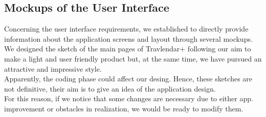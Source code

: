 \subsection{Mockups of the User Interface}
	\begin{flushleft}
		Concerning the user interface requirements, we established to directly provide information about the application screens and layout through several mockups. \\
		We designed the sketch of the main pages of Travlendar+ following our aim to make a light and user friendly product but, at the same time, we have pursued an attractive and impressive style. \\
		Apparently, the coding phase could affect our desing. Hence, these sketches are not definitive, their aim is to give an idea of the application design. \\
		For this reason, if we notice that some changes are necessary due to either app. improvement or obstacles in realization, we would be ready to modify them. 
	\end{flushleft}
\clearpage

